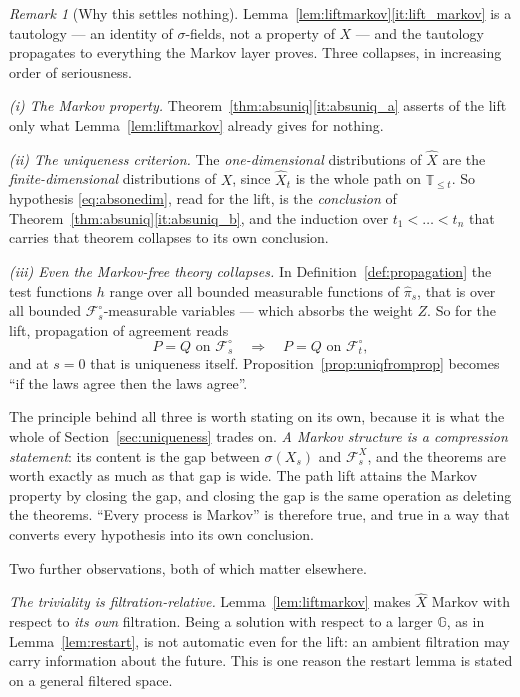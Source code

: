 \documentclass[11pt,a4paper]{article}
\theoremstyle{plain}
\theoremstyle{definition}
\theoremstyle{remark}
\newtheorem{remark}[theorem]{Remark}
\newcommand{\T}{\mathbb{T}}                     %
\newcommand{\Filt}{\mathcal{F}}
\begin{document}
\begin{remark}[Why this settles nothing]
  \label{rem:liftcollapse}
  Lemma~\ref{lem:liftmarkov}\ref{it:lift_markov} is a tautology --- an identity of
  $\sigma$-fields, not a property of $X$ --- and the tautology propagates to
  everything the Markov layer proves.  Three collapses, in increasing order of
  seriousness.

  \emph{(i) The Markov property.}  Theorem~\ref{thm:absuniq}\ref{it:absuniq_a}
  asserts of the lift only what Lemma~\ref{lem:liftmarkov} already gives for
  nothing.

  \emph{(ii) The uniqueness criterion.}  The \emph{one-dimensional}
  distributions of $\hat{X}$ are the \emph{finite-dimensional} distributions of
  $X$, since $\hat{X}_t$ is the whole path on $\T_{\leq t}$.  So hypothesis
  \eqref{eq:absonedim}, read for the lift, is the \emph{conclusion} of
  Theorem~\ref{thm:absuniq}\ref{it:absuniq_b}, and the induction over
  $t_1 < \dots < t_n$ that carries that theorem collapses to its own conclusion.

  \emph{(iii) Even the Markov-free theory collapses.}  In
  Definition~\ref{def:propagation} the test functions $h$ range over all bounded
  measurable functions of $\hat\pi_s$, that is over all bounded
  $\Filt^\circ_s$-measurable variables --- which absorbs the weight $Z$.  So for
  the lift, propagation of agreement reads
  \[
    P = Q \text{ on } \Filt^\circ_s
      \quad \Longrightarrow \quad P = Q \text{ on } \Filt^\circ_t ,
  \]
  and at $s = 0$ that is uniqueness itself.  Proposition~\ref{prop:uniqfromprop}
  becomes ``if the laws agree then the laws agree''.

  The principle behind all three is worth stating on its own, because it is what
  the whole of Section~\ref{sec:uniqueness} trades on.  \emph{A Markov structure
  is a compression statement}: its content is the gap between $\sigma(X_s)$ and
  $\Filt^X_s$, and the theorems are worth exactly as much as that gap is wide.
  The path lift attains the Markov property by closing the gap, and closing the
  gap is the same operation as deleting the theorems.  ``Every process is
  Markov'' is therefore true, and true in a way that converts every hypothesis
  into its own conclusion.

  Two further observations, both of which matter elsewhere.

  \emph{The triviality is filtration-relative.}  Lemma~\ref{lem:liftmarkov} makes
  $\hat{X}$ Markov with respect to \emph{its own} filtration.  Being a solution
  with respect to a larger $\mathbb{G}$, as in Lemma~\ref{lem:restart}, is not
  automatic even for the lift: an ambient filtration may carry information about
  the future.  This is one reason the restart lemma is stated on a general
  filtered space.


\end{remark}
\end{document}
